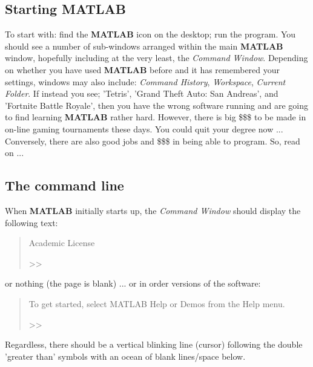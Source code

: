 \documentclass{tufte-book} %
\newenvironment{docspec}{\begin{quotation}\ttfamily\parskip0pt\parindent0pt\ignorespaces}{\end{quotation}}
\begin{document}
\subsection{Starting MATLAB}

To start with: find the \textbf{MATLAB} icon on the desktop; run the program. You should see a number of sub-windows arranged within the main \textbf{MATLAB} window, hopefully including at the very least, the \textit{Command Window}. Depending on whether you have used \textbf{MATLAB} before and it has remembered your settings, windows may also include: \textit{Command History}, \textit{Workspace}, \textit{Current Folder}. If instead you see; 'Tetris', 'Grand Theft Auto: San Andreas', and 'Fortnite Battle Royale', then you have the wrong software running and are going to find learning \textbf{MATLAB} rather hard. However, there is big \$\$\$ to be made in on-line gaming tournaments these days. You could quit your degree now ...
Conversely, there are also good jobs and  \$\$\$ in being able to program. So, read on ...
\subsection{The command line}

When \textbf{MATLAB} initially starts up, the \textit{Command Window} should display the following text: 

\begin{docspec}
        Academic License

>>
\end{docspec}

\noindent or nothing (the page is blank) ... or in order versions of the software:

\begin{docspec}
To get started, select MATLAB Help or Demos from the Help menu.

>>
\end{docspec}

\noindent Regardless, there should be a vertical blinking line (cursor) following the double 'greater than' symbols with an ocean of blank lines/space below.
\end{document}

